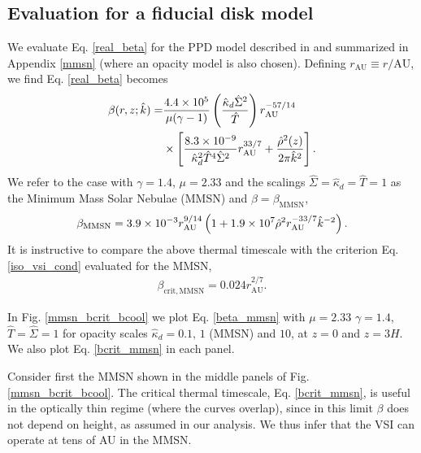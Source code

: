 \subsection{Evaluation for a fiducial disk model}
We evaluate Eq. \ref{real_beta} for the PPD model
described in \cite{chiang10} and summarized in Appendix \ref{mmsn}
(where an opacity model is also chosen). Defining $r_\mathrm{AU}\equiv 
r/\mathrm{AU}$, we find Eq. \ref{real_beta} becomes
\begin{align}\label{beta_mmsn}
  \beta(r, z; \hat{k}) =
  &\frac{4.4\times10^5}{\mu(\gamma-1)}\left(\frac{\hat{\kappa}_d\hat{\Sigma}^2}{\hat{T}}\right)r_\mathrm{AU}^{-57/14}\notag\\ 
&\times\left[\frac{8.3\times10^{-9}}{\hat{\kappa}_d^2\hat{T}^4\hat{\Sigma}^2}r_\mathrm{AU}^{33/7}+\frac{\hat{\rho}^2(z)}{2\pi\hat{k}^2}\right].         
\end{align} 
We refer to the case with $\gamma=1.4$, $\mu=2.33$ and the scalings
$\hat{\Sigma}=\hat{\kappa}_d=\hat{T}=1$ as the Minimum Mass Solar
Nebulae (MMSN) and $\beta=\beta_\mathrm{MMSN}$, 
\begin{align}\label{beta_mmsn_simp}
  \beta_\mathrm{MMSN} = 3.9\times10^{-3} r_\mathrm{AU}^{9/14}\left( 1 +
    1.9\times10^7\hat{\rho}^2r_\mathrm{AU}^{-33/7}\hat{k}^{-2}\right). 
\end{align}
It is instructive to compare the above thermal timescale 
with the criterion Eq. \ref{iso_vsi_cond} evaluated for the MMSN,     
\begin{align}\label{bcrit_mmsn}
  \beta_\mathrm{crit,MMSN} = 0.024r_\mathrm{AU}^{2/7}. 
\end{align}

In Fig. \ref{mmsn_bcrit_bcool} we plot Eq. \ref{beta_mmsn}  with $\mu
=2.33$ $\gamma=1.4$, $\hat{T}=\hat{\Sigma}=1$ for opacity scales
$\hat{\kappa}_d=0.1, \,1 $ (MMSN) and $10$, at $z=0$ and $z=3H$. We
also plot Eq. \ref{bcrit_mmsn} in each panel.   

Consider first the MMSN shown in the middle panels of 
Fig. \ref{mmsn_bcrit_bcool}. The critical thermal timescale,
Eq. \ref{bcrit_mmsn}, is useful in the optically thin regime (where the
curves overlap), since in this limit $\beta$ does not depend on
height, as assumed in our analysis. We thus infer that the VSI can
operate at tens of AU in the MMSN.  

